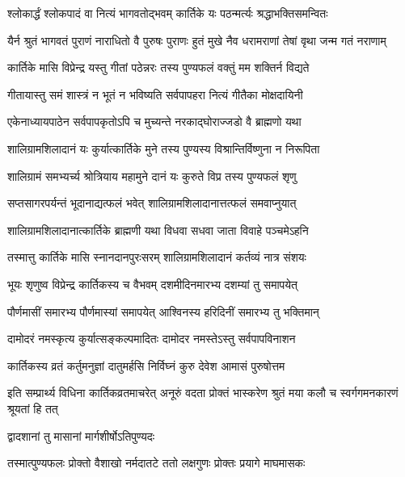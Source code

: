 \twolineshloka
{श्लोकार्द्धं श्लोकपादं वा नित्यं भागवतोद्भवम्}
{कार्तिके यः पठन्मर्त्यः श्रद्धाभक्तिसमन्वितः} %

\fourlineindentedshloka
{यैर्न श्रुतं भागवतं पुराणं}
{नाराधितो वै पुरुषः पुराणः}
{हुतं मुखे नैव धरामराणां}
{तेषां वृथा जन्म गतं नराणाम्} %

\twolineshloka
{कार्तिके मासि विप्रेन्द्र यस्तु गीतां पठेन्नरः}
{तस्य पुण्यफलं वक्तुं मम शक्तिर्न विद्यते} %

\twolineshloka
{गीतायास्तु समं शास्त्रं न भूतं न भविष्यति}
{सर्वपापहरा नित्यं गीतैका मोक्षदायिनी} %

\twolineshloka
{एकेनाध्यायपाठेन सर्वपापकृतोऽपि च}
{मुच्यन्ते नरकाद्घोराज्जडो वै ब्राह्मणो यथा} %

\twolineshloka
{शालिग्रामशिलादानं यः कुर्यात्कार्तिके मुने}
{तस्य पुण्यस्य विश्रान्तिर्विष्णुना न निरूपिता} %

\twolineshloka
{शालिग्रामं समभ्यर्च्य श्रोत्रियाय महामुने}
{दानं यः कुरुते विप्र तस्य पुण्यफलं शृणु} %

\twolineshloka
{सप्तसागरपर्यन्तं भूदानाद्यत्फलं भवेत्}
{शालिग्रामशिलादानात्तत्फलं समवाप्नुयात्} %

\twolineshloka
{शालिग्रामशिलादानात्कार्तिके ब्राह्मणी यथा}
{विधवा सधवा जाता विवाहे पञ्चमेऽहनि} %

\twolineshloka
{तस्मात्तु कार्तिके मासि स्नानदानपुरःसरम्}
{शालिग्रामशिलादानं कर्तव्यं नात्र संशयः} %





\twolineshloka
{भूयः शृणुष्व विप्रेन्द्र कार्तिकस्य च वैभवम्}
{दशमीदिनमारभ्य दशम्यां तु समापयेत्} %

\twolineshloka
{पौर्णमासीं समारभ्य पौर्णमास्यां समापयेत्}
{आश्विनस्य हरिदिनीं समारभ्य तु भक्तिमान्} %

\twolineshloka
{दामोदरं नमस्कृत्य कुर्यात्सङ्कल्पमादितः}
{दामोदर नमस्तेऽस्तु सर्वपापविनाशन} %

\twolineshloka
{कार्तिकस्य व्रतं कर्तुमनुज्ञां दातुमर्हसि}
{निर्विघ्नं कुरु देवेश आमासं पुरुषोत्तम} %

\threelineshloka
{इति सम्प्रार्थ्य विधिना कार्तिकव्रतमाचरेत्}
{अनूरुं वदता प्रोक्तं भास्करेण श्रुतं मया}
{कलौ च स्वर्गगमनकारणं श्रूयतां हि तत्} %



\onelineshloka
{द्वादशानां तु मासानां मार्गशीर्षोऽतिपुण्यदः} %

\twolineshloka
{तस्मात्पुण्यफलः प्रोक्तो वैशाखो नर्मदातटे}
{ततो लक्षगुणः प्रोक्तः प्रयागे माघमासकः} %

